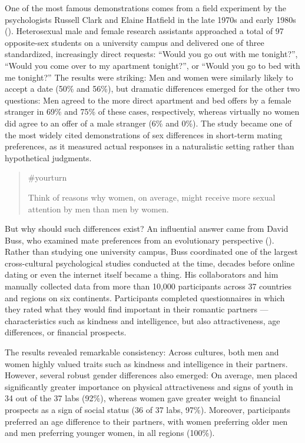 \documentclass[
  letterpaper,
]{book}
\begin{document}
One of the most famous demonstrations comes from a field experiment by
the psychologists Russell Clark and Elaine Hatfield in the late 1970s
and early 1980s (). Heterosexual male and female research assistants approached a
total of 97 opposite-sex students on a university campus and delivered
one of three standardized, increasingly direct requests: ``Would you go
out with me tonight?'', ``Would you come over to my apartment
tonight?'', or ``Would you go to bed with me tonight?'' The results were
striking: Men and women were similarly likely to accept a date (50\% and
56\%), but dramatic differences emerged for the other two questions: Men
agreed to the more direct apartment and bed offers by a female stranger
in 69\% and 75\% of these cases, respectively, whereas virtually no
women did agree to an offer of a male stranger (6\% and 0\%). The study
became one of the most widely cited demonstrations of sex differences in
short-term mating preferences, as it measured actual responses in a
naturalistic setting rather than hypothetical judgments.

\begin{quote}
{\#yourturn}

Think of reasons why women, on average, might receive more sexual
attention by men than men by women.
\end{quote}

But why should such differences exist? An influential answer came from
David Buss, who examined mate preferences from an evolutionary
perspective (). Rather than
studying one university campus, Buss coordinated one of the largest
cross-cultural psychological studies conducted at the time, decades
before online dating or even the internet itself became a thing. His
collaborators and him manually collected data from more than 10,000
participants across 37 countries and regions on six continents.
Participants completed questionnaires in which they rated what they
would find important in their romantic partners --- characteristics such
as kindness and intelligence, but also attractiveness, age differences,
or financial prospects.

The results revealed remarkable consistency: Across cultures, both men
and women highly valued traits such as kindness and intelligence in
their partners. However, several robust gender differences also emerged:
On average, men placed significantly greater importance on physical
attractiveness and signs of youth in 34 out of the 37 labs (92\%),
whereas women gave greater weight to financial prospects as a sign of
social status (36 of 37 labs, 97\%). Moreover, participants preferred an
age difference to their partners, with women preferring older men and
men preferring younger women, in all regions (100\%).
\end{document}
